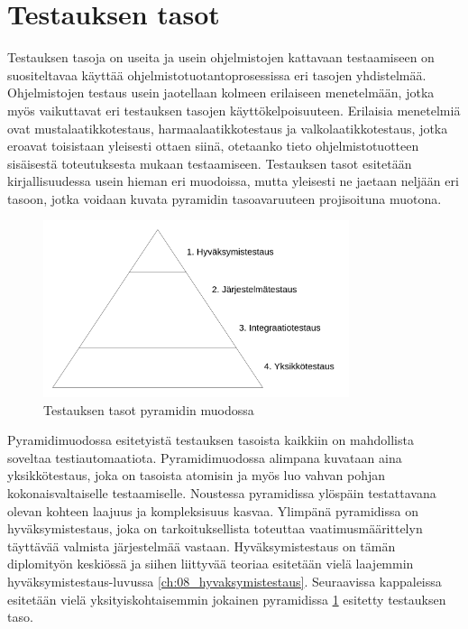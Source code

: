 \section{Testauksen tasot} \label{ch:07_testauksen_tasot}

Testauksen tasoja on useita ja usein ohjelmistojen kattavaan testaamiseen on suositeltavaa käyttää ohjelmistotuotantoprosessissa eri tasojen yhdistelmää.
Ohjelmistojen testaus usein jaotellaan kolmeen erilaiseen menetelmään, jotka myös vaikuttavat eri testauksen tasojen käyttökelpoisuuteen.
Erilaisia menetelmiä ovat mustalaatikkotestaus, harmaalaatikkotestaus ja valkolaatikkotestaus, jotka eroavat toisistaan yleisesti ottaen siinä, otetaanko tieto ohjelmistotuotteen sisäisestä toteutuksesta mukaan testaamiseen.
Testauksen tasot esitetään kirjallisuudessa usein hieman eri muodoissa, mutta yleisesti ne jaetaan neljään eri tasoon, jotka voidaan kuvata pyramidin tasoavaruuteen projisoituna muotona.

\begin{figure}[H]
  \centering
  \includegraphics[width=0.8\textwidth]{assets/testing-levels-pyramid.png}
  \caption{Testauksen tasot pyramidin muodossa}
  \label{fig:testing_levels_pyramid}
\end{figure}

Pyramidimuodossa esitetyistä testauksen tasoista kaikkiin on mahdollista soveltaa testiautomaatiota.
Pyramidimuodossa alimpana kuvataan aina yksikkötestaus, joka on tasoista atomisin ja myös luo vahvan pohjan kokonaisvaltaiselle testaamiselle.
Noustessa pyramidissa ylöspäin testattavana olevan kohteen laajuus ja kompleksisuus kasvaa.
Ylimpänä pyramidissa on hyväksymistestaus, joka on tarkoituksellista toteuttaa vaatimusmäärittelyn täyttävää valmista järjestelmää vastaan.
Hyväksymistestaus on tämän diplomityön keskiössä ja siihen liittyvää teoriaa esitetään vielä laajemmin hyväksymistestaus-luvussa \ref{ch:08_hyvaksymistestaus}.
Seuraavissa kappaleissa esitetään vielä yksityiskohtaisemmin jokainen pyramidissa \ref{fig:testing_levels_pyramid} esitetty testauksen taso.

